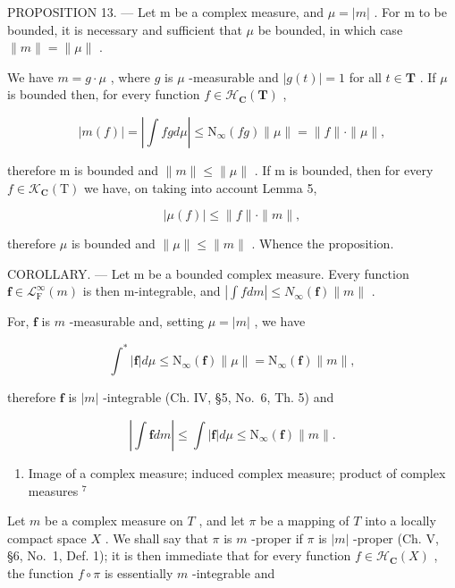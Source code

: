 PROPOSITION 13. --- Let m be a complex measure, and \(\mu = |m|\) . For m to be bounded, it is necessary and sufficient that \(\mu\) be bounded, in which case \(\|m\| = \|\mu\|\) .

We have \(m = g \cdot \mu\) , where \(g\) is \(\mu\) -measurable and \(|g(t)| = 1\) for all \(t \in \mathbf{T}\) . If \(\mu\) is bounded then, for every function \(f \in \mathcal{H}_{\mathbf{C}}(\mathbf{T})\) ,

\[
| m (f) | = \left| \int f g d \mu \right| \leqslant \mathrm{N} _ {\infty} (f g) \| \mu \| = \| f \| \cdot \| \mu \|,
\]

therefore m is bounded and \(\|m\|\leqslant\|\mu\|\) . If m is bounded, then for every \(f\in\mathcal{K}_{\mathbf{C}}(\mathrm{T})\) we have, on taking into account Lemma 5,

\[
| \mu (f) | \leqslant \| f \| \cdot \| m \|,
\]

therefore \(\mu\) is bounded and \(\| \mu \| \leqslant \| m\|\) . Whence the proposition.

COROLLARY. --- Let m be a bounded complex measure. Every function \(\mathbf{f} \in \mathcal{L}_{\mathrm{F}}^{\infty}(m)\) is then m-integrable, and \(\left|\int f dm\right| \leqslant N_{\infty}(\mathbf{f}) \|m\|\) .

For, \(\mathbf{f}\) is \(m\) -measurable and, setting \(\mu = |m|\) , we have

\[
\int^ {*} | \mathbf {f} | d \mu \leqslant \mathrm{N} _ {\infty} (\mathbf {f}) \| \mu \| = \mathrm{N} _ {\infty} (\mathbf {f}) \| m \|,
\]

therefore \(\mathbf{f}\) is \(|m|\) -integrable (Ch. IV, §5, No.~6, Th. 5) and

\[
\left| \int \mathbf {f} d m \right| \leqslant \int | \mathbf {f} | d \mu \leqslant \mathrm{N} _ {\infty} (\mathbf {f}) \| m \|.
\]

\begin{enumerate}
\def\labelenumi{\arabic{enumi}.}
\setcounter{enumi}{9}
\tightlist
\item
  Image of a complex measure; induced complex measure; product of complex measures \(^{7}\)
\end{enumerate}

Let \(m\) be a complex measure on \(T\) , and let \(\pi\) be a mapping of \(T\) into a locally compact space \(X\) . We shall say that \(\pi\) is \(m\) -proper if \(\pi\) is \(|m|\) -proper (Ch. V, §6, No.~1, Def. 1); it is then immediate that for every function \(f \in \mathcal{H}_{\mathbf{C}}(X)\) , the function \(f \circ \pi\) is essentially \(m\) -integrable and

